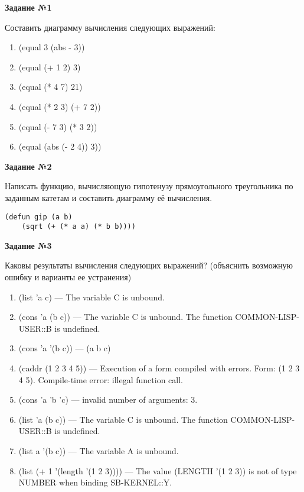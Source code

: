 \textbf{Задание №1}

Составить диаграмму вычисления следующих выражений:
\begin{enumerate}
    \item (equal 3 (abs - 3))
    \item (equal (+ 1 2) 3)
    \item (equal (* 4 7) 21)
    \item (equal (* 2 3) (+ 7 2))
    \item (equal (- 7 3) (* 3 2))
    \item (equal (abs (- 2 4)) 3))
\end{enumerate}

\FloatBarrier


\textbf{Задание №2}

Написать функцию, вычисляющую гипотенузу прямоугольного
треугольника по заданным катетам и составить диаграмму её вычисления.

\begin{center}
    \captionsetup{justification=raggedright,singlelinecheck=off}
    \begin{lstlisting}[label=lst:task_2,caption=Код функции]
    (defun gip (a b)
    (sqrt (+ (* a a) (* b b))))
\end{lstlisting}
\end{center}

\FloatBarrier

\clearpage
\textbf{Задание №3}

Каковы результаты вычисления следующих выражений? (объяснить возможную ошибку и варианты ее устранения)
\begin{enumerate}
    \item (list 'a c) --- The variable C is unbound.
    \item (cons 'a (b c)) --- The variable C is unbound. The function COMMON-LISP-USER::B is undefined.
    \item (cons 'a '(b c)) --- (a b c)
    \item (caddr (1 2 3 4 5)) --- Execution of a form compiled with errors. Form: (1 2 3 4 5). Compile-time error: illegal function call.
    \item (cons 'a 'b 'c) --- invalid number of arguments: 3.
    \item (list 'a (b c)) --- The variable C is unbound. The function COMMON-LISP-USER::B is undefined.
    \item (list a '(b c)) --- The variable A is unbound.
    \item (list (+ 1 '(length '(1 2 3)))) --- The value (LENGTH '(1 2 3)) is not of type NUMBER when binding SB-KERNEL::Y.
\end{enumerate}

